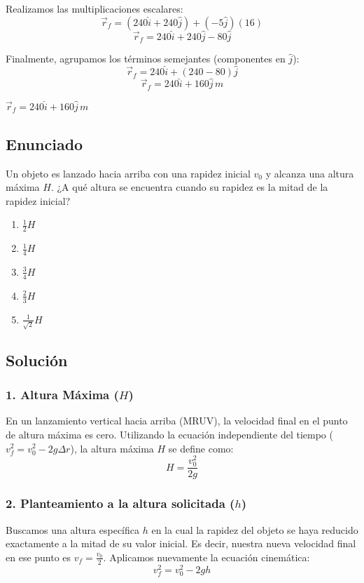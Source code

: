 \documentclass[12pt, a4paper]{article}
\begin{document}
Realizamos las multiplicaciones escalares:
$$ \vec{r}_f = (240\hat{i} + 240\hat{j}) + (-5\hat{j}) (16) $$
$$ \vec{r}_f = 240\hat{i} + 240\hat{j} - 80\hat{j} $$

Finalmente, agrupamos los términos semejantes (componentes en $\hat{j}$):
$$ \vec{r}_f = 240\hat{i} + (240 - 80)\hat{j} $$
$$ \vec{r}_f = 240\hat{i} + 160\hat{j} \, \si{m} $$

\begin{tcolorbox}[colback=green!5!white, colframe=green!50!black, title=Respuesta Final]
\centering \Large $\vec{r}_f = 240\hat{i} + 160\hat{j} \, \si{m}$
\end{tcolorbox}

\newpage

\subsection*{Enunciado}
Un objeto es lanzado hacia arriba con una rapidez inicial $v_0$ y alcanza una altura máxima $H$. ¿A qué altura se encuentra cuando su rapidez es la mitad de la rapidez inicial?

\begin{enumerate}[label=\alph*)]
    \item $\frac{1}{2}H$
    \item $\frac{1}{4}H$
    \item $\frac{3}{4}H$
    \item $\frac{2}{3}H$
    \item $\frac{1}{\sqrt{2}}H$
\end{enumerate}

\subsection*{Solución}

\subsubsection*{1. Altura Máxima ($H$)}
En un lanzamiento vertical hacia arriba (MRUV), la velocidad final en el punto de altura máxima es cero. Utilizando la ecuación independiente del tiempo ($v_f^2 = v_0^2 - 2g\Delta r$), la altura máxima $H$ se define como:
$$ H = \frac{v_0^2}{2g} $$

\subsubsection*{2. Planteamiento a la altura solicitada ($h$)}
Buscamos una altura específica $h$ en la cual la rapidez del objeto se haya reducido exactamente a la mitad de su valor inicial. Es decir, nuestra nueva velocidad final en ese punto es $v_f = \frac{v_0}{2}$.
Aplicamos nuevamente la ecuación cinemática:
$$ v_f^2 = v_0^2 - 2gh $$
\end{document}
